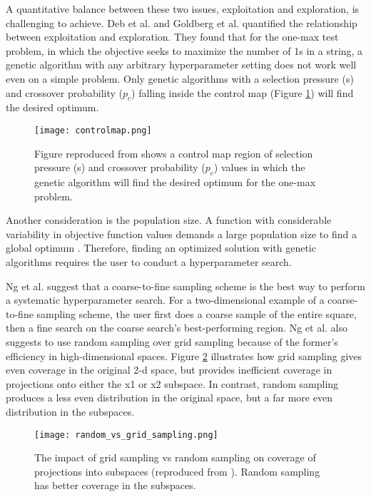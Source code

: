 A quantitative balance between these two issues, exploitation and exploration, 
is challenging to achieve. 
Deb et al. \cite{deb_multi-objective_2001} and Goldberg et al. 
\cite{goldberg_toward_1993} quantified the relationship between exploitation 
and exploration. 
They found that for the one-max test problem, in which the objective seeks to 
maximize the number of 1s in a string, a genetic algorithm with any arbitrary 
hyperparameter setting does not work well even on a simple problem. 
Only genetic algorithms with a selection pressure (s) and crossover probability ($p_c$) 
falling inside the control map (Figure \ref{fig:controlmap}) will find the desired 
optimum.  
\begin{figure}[]
    \centering
    \texttt{[image: controlmap.png]} 
    \caption{Figure reproduced from \cite{goldberg_toward_1993,deb_multi-objective_2001}
    shows a control map region of selection pressure (s) and crossover probability ($p_c$)
    values in which the genetic algorithm will find the desired optimum for the 
    one-max problem.}
    \label{fig:controlmap}
\end{figure}
Another consideration is the population size. 
A function with considerable variability in objective function values demands 
a large population size to find a global optimum \cite{deb_multi-objective_2001}. 
Therefore, finding an optimized solution with genetic algorithms requires the user 
to conduct a hyperparameter search. 

Ng et al. \cite{ng_improving_2021} suggest that a coarse-to-fine sampling scheme 
is the best way to perform a systematic hyperparameter search.  
For a two-dimensional example of a coarse-to-fine sampling scheme, the user 
first does a coarse sample of the entire square, then a fine search on the 
coarse search's best-performing region. 
Ng et al. also suggests to use random sampling over grid sampling because of the 
former's efficiency in high-dimensional spaces. 
Figure \ref{fig:random_vs_grid_sampling} illustrates how grid sampling gives 
even coverage in the original 2-d space, but provides inefficient coverage in 
projections onto either the x1 or x2 subspace.  
In contrast, random sampling produces a less even distribution in the original 
space, but a far more even distribution in the subspaces.
\begin{figure}[H]
    \centering
    \texttt{[image: random\_vs\_grid\_sampling.png]} 
    \caption{The impact of grid sampling vs random sampling on coverage of projections 
    into subspaces (reproduced from \cite{jordan_hyperparameter_2017}). 
    Random sampling has better coverage in the subspaces.}
    \label{fig:random_vs_grid_sampling}
\end{figure}

